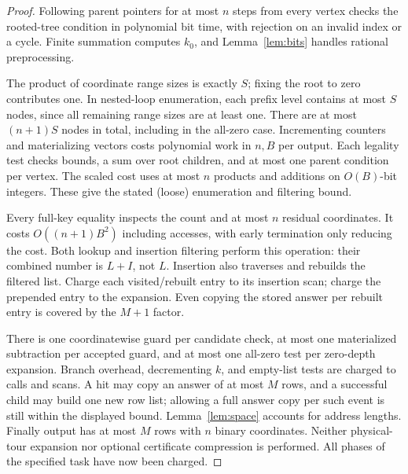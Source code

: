 \documentclass[11pt,a4paper]{article}
\theoremstyle{definition}
\theoremstyle{remark}
\begin{document}
\begin{proof}
Following parent pointers for at most \(n\) steps from every vertex checks
the rooted-tree condition in polynomial bit time, with rejection on an
invalid index or a cycle. Finite summation computes \(k_0\), and
Lemma~\ref{lem:bits} handles rational preprocessing.

The product of coordinate range sizes is exactly \(S\); fixing the root
to zero contributes one. In nested-loop enumeration, each prefix level
contains at most \(S\) nodes, since all remaining range sizes are at least
one. There are at most \((n+1)S\) nodes in total, including in the all-zero
case. Incrementing counters and materializing vectors costs polynomial
work in \(n,B\) per output. Each legality test checks bounds, a sum over
root children, and at most one parent condition per vertex. The scaled
cost uses at most \(n\) products and additions on \(O(B)\)-bit integers.
These give the stated (loose) enumeration and filtering bound.

Every full-key equality inspects the count and at most \(n\) residual
coordinates. It costs \(O((n+1)B^2)\) including accesses, with early
termination only reducing the cost. Both lookup and insertion filtering
perform this operation: their combined number is \(L+I\), not \(L\).
Insertion also traverses and rebuilds the filtered list. Charge each
visited/rebuilt entry to its insertion scan; charge the prepended entry
to the expansion. Even copying the stored answer per rebuilt entry is
covered by the \(M+1\) factor.

There is one coordinatewise guard per candidate check, at most one
materialized subtraction per accepted guard, and at most one all-zero
test per zero-depth expansion. Branch overhead, decrementing \(k\),
and empty-list tests are charged to calls and scans. A hit may copy an
answer of at most \(M\) rows, and a successful child may build one new
row list; allowing a full answer copy per such event is still within
the displayed bound. Lemma~\ref{lem:space} accounts for address lengths.
Finally output has at most \(M\) rows with \(n\) binary coordinates.
Neither physical-tour expansion nor optional certificate compression is
performed. All phases of the specified task have now been charged.
\end{proof}
\end{document}

